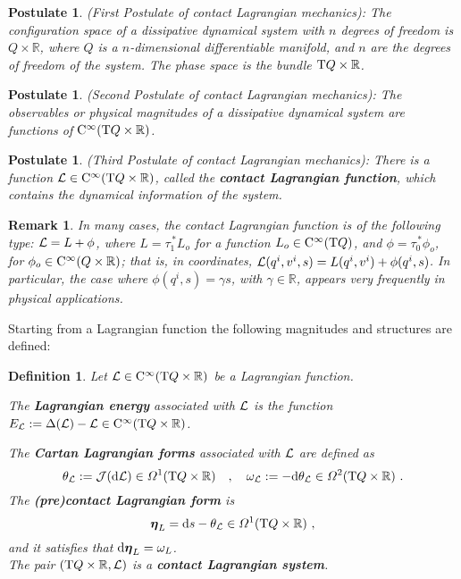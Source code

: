 \documentclass[12pt]{report}
\newtheorem{definition}[teor]{Definition}
\newtheorem{remark}[teor]{Remark}
\newtheorem{pos}[teor]{Postulate}
\def\df{{\mit\Omega}}
\def\Lag{{\cal L}}
\def\d{{\rm d}}
\def\Real{\mathbb{R}}
\def\bmeta{\mbox{\boldmath $\eta$}}
\def\Tan{{\rm T}}
\def\Cinfty{{\rm C}^\infty}
\begin{document}
\begin{pos}
{\rm (First Postulate of contact Lagrangian mechanics\/)}:
The configuration space of a dissipative dynamical system with $n$ degrees of freedom 
is $Q\times\Real$, where $Q$ is a $n$-dimensional differentiable manifold, and $n$ are the degrees of freedom of the system.
The phase space is the bundle $\Tan Q\times\Real$.
\end{pos}

\begin{pos}
{\rm (Second Postulate of contact Lagrangian mechanics\/)}:
The observables or physical magnitudes of a 
dissipative dynamical system are functions of $\Cinfty(\Tan Q\times\Real)$.
\end{pos}

\begin{pos}
{\rm (Third Postulate of contact Lagrangian mechanics\/)}:
There is a function $\Lag\in\Cinfty (\Tan Q\times\Real)$, 
called the {\sl \textbf{contact Lagrangian function}},
which contains the dynamical information of the system.
\end{pos}

\begin{remark}{\rm
In many cases, the contact Lagrangian function is of the following type:
$\Lag=L+\phi$, 
where $L=\tau_1^{\,*}L_o$ for a function
$L_o\in\Cinfty(\Tan Q)$, and $\phi=\tau_0^{\,*}\phi_o$, for $\phi_o\in\Cinfty(Q\times\Real)$;
that is, in coordinates, $\Lag(q^i,v^i,s)=L(q^i,v^i)+\phi(q^i,s)$.
In particular, the case where $\phi(q^i,s)=\gamma s$, with $\gamma\in\Real$,
appears very frequently in physical applications.   
}\end{remark}

Starting from a Lagrangian function the following magnitudes and structures are defined:

\begin{definition}
\label{definition:lagrangian-function}
Let $\Lag\in\Cinfty(\Tan Q\times\Real)$ be a Lagrangian function.

\noindent The {\sl\textbf{Lagrangian energy}}
associated with $\Lag$ is the function $E_\Lag:= \Delta(\Lag)-\Lag\in\Cinfty(\Tan Q\times\Real)$. 

\noindent The {\sl\textbf{Cartan Lagrangian forms}}
associated with $\Lag$ are defined as
\begin{equation}
\label{eq:thetaL}
\theta_\Lag:={\cal J}(\d\Lag)\in\df^1(\Tan Q\times\Real) 
\quad ,\quad
\omega_\Lag:=-\d\theta_\Lag\in\df^2(\Tan Q\times\Real)  \ .
\end{equation}
The {\sl\textbf{(pre)contact Lagrangian form}} is
$$
\bmeta_L=\d s-\theta_\Lag\in\df^1(\Tan Q\times\Real)
\ ,
$$
and it satisfies that $\d\bmeta_L=\omega_L$.
\\
The pair $(\Tan Q\times\Real,\Lag)$ is a {\sl\textbf{contact Lagrangian system}}.
\end{definition}
\end{document}
